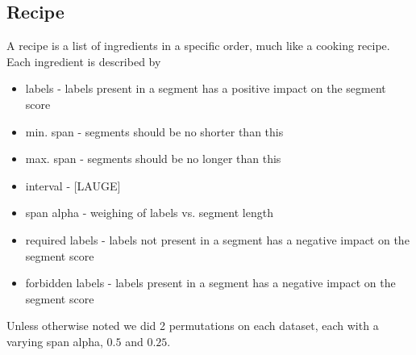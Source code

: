 \subsection{Recipe}
%
A recipe is a list of ingredients in a specific order, much like a cooking recipe. Each ingredient is described by
\begin{itemize}
\item labels - labels present in a segment has a positive impact on the segment score
\item min. span - segments should be no shorter than this
\item max. span - segments should be no longer than this
\item interval - [LAUGE]
\item span alpha - weighing of labels vs. segment length
\item required labels - labels not present in a segment has a negative impact on the segment score
\item forbidden labels - labels present in a segment has a negative impact on the segment score
\end{itemize}
Unless otherwise noted we did 2 permutations on each dataset, each with a varying span alpha, $0.5$ and $0.25$.
%
%
%
